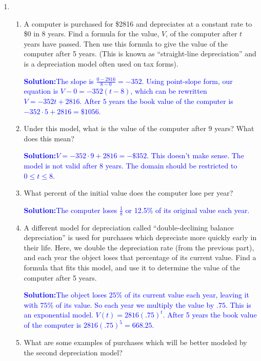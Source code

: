 \documentclass[letterpaper,11pt]{article}
\newcommand{\sol}[2]{\begin{minipage}[c][#1]{\linewidth}{\textcolor{blue}{\textbf{Solution:}}\quad \textcolor{blue}{#2}}\end{minipage}}
\newcommand{\sol}[2]{\begin{minipage}[c][#1]{\linewidth}{\vfill}\end{minipage}}
\begin{document}

\begin{enumerate}

\item 
\begin{enumerate}
\item A computer is purchased for \$2816 and depreciates at a constant rate to \$0 in 8 years.  Find a formula for the value, $V$,
of the computer after $t$ years have passed.  Then use this formula to give the value of the computer after 5 years.  (This is known as ``straight-line depreciation'' and is a depreciation model often used on tax forms).

\sol{1.5 in}{The slope is $\frac{0-2816}{8-0}=-352.$ Using point-slope form, our equation is $V-0=-352(t-8)$, which can be rewritten $V=-352t+2816$.  After $5$ years the book value of the computer is $-352\cdot 5 + 2816 = \$1056$.}

\item  Under this model, what is the value of the computer after 9 years?  What does this mean?

\sol{1 in}{$V=-352\cdot 9 + 2816 = -\$352$. This doesn't make sense.  The model is not valid after 8 years.  The domain should be restricted to $0\leq t \leq 8$.}

\item What percent of the initial value does the computer lose per year?

\sol{.7in}{The computer loses $\frac{1}{8}$ or 12.5\% of its original value each year.}

\item  A different model for depreciation called ``double-declining balance depreciation'' is used for purchases which depreciate more quickly early in their life.  Here, we double the depreciation rate (from the previous part), and each year the object loses that percentage of its current value. Find a formula that fits this model, and use it to determine the value of the computer after 5 years.

\sol{1.8in}{The object loses $25\%$ of its current value each year, leaving it with $75\% $ of its value.  So each year we multiply the value by $.75$.  This is an exponential model.  $V(t) = 2816(.75)^t$.  After 5 years the book value of the computer is $2816(.75)^5=668.25$.}

\item  What are some examples of purchases which will be better modeled by the second depreciation model?


\end{enumerate}
\end{enumerate}
\end{document}

